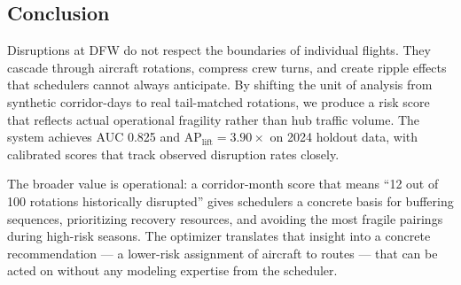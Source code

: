 \documentclass[11pt, twoside]{article}
\begin{document}
\subsection{Conclusion}

Disruptions at DFW do not respect the boundaries of individual flights.
They cascade through aircraft rotations, compress crew turns, and create
ripple effects that schedulers cannot always anticipate.  By shifting the
unit of analysis from synthetic corridor-days to real tail-matched rotations,
we produce a risk score that reflects actual operational fragility rather
than hub traffic volume.  The system achieves AUC 0.825 and
$\mathrm{AP}_{\text{lift}} = 3.90\times$ on 2024 holdout data, with
calibrated scores that track observed disruption rates closely.

The broader value is operational: a corridor-month score that means
``12 out of 100 rotations historically disrupted'' gives schedulers a concrete
basis for buffering sequences, prioritizing recovery resources, and avoiding
the most fragile pairings during high-risk seasons.  The optimizer translates
that insight into a concrete recommendation --- a lower-risk assignment of
aircraft to routes --- that can be acted on without any modeling expertise
from the scheduler.

\newpage

\end{document}

